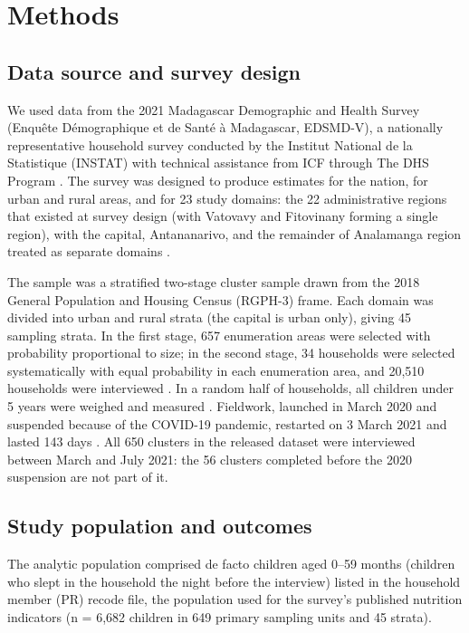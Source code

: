 \documentclass[11pt,a4paper]{article}
\begin{document}
\section{Methods}\label{methods}

\subsection{Data source and survey
design}\label{data-source-and-survey-design}

We used data from the 2021 Madagascar Demographic and Health Survey
(Enquête Démographique et de Santé à Madagascar, EDSMD-V), a nationally
representative household survey conducted by the Institut National de la
Statistique (INSTAT) with technical assistance from ICF through The DHS
Program \cite{instat2022edsmd}. The survey was designed to produce
estimates for the nation, for urban and rural areas, and for 23 study
domains: the 22 administrative regions that existed at survey design
(with Vatovavy and Fitovinany forming a single region), with the
capital, Antananarivo, and the remainder of Analamanga region treated as
separate domains \cite{instat2022edsmd}.

The sample was a stratified two-stage cluster sample drawn from the 2018
General Population and Housing Census (RGPH-3) frame. Each domain was
divided into urban and rural strata (the capital is urban only), giving
45 sampling strata. In the first stage, 657 enumeration areas were
selected with probability proportional to size; in the second stage, 34
households were selected systematically with equal probability in each
enumeration area, and 20,510 households were interviewed
\cite{instat2022edsmd}. In a random half of households, all children
under 5 years were weighed and measured \cite{instat2022edsmd}.
Fieldwork, launched in March 2020 and suspended because of the COVID-19
pandemic, restarted on 3 March 2021 and lasted 143 days
\cite{instat2022edsmd}. All 650 clusters in the released dataset were
interviewed between March and July 2021: the 56 clusters completed
before the 2020 suspension are not part of it.

\subsection{Study population and
outcomes}\label{study-population-and-outcomes}

The analytic population comprised de facto children aged 0--59 months
(children who slept in the household the night before the interview)
listed in the household member (PR) recode file, the population used for
the survey's published nutrition indicators
\cite{instat2022edsmd,croft2023guide} (n = 6,682 children in 649 primary
sampling units and 45 strata).
\end{document}
